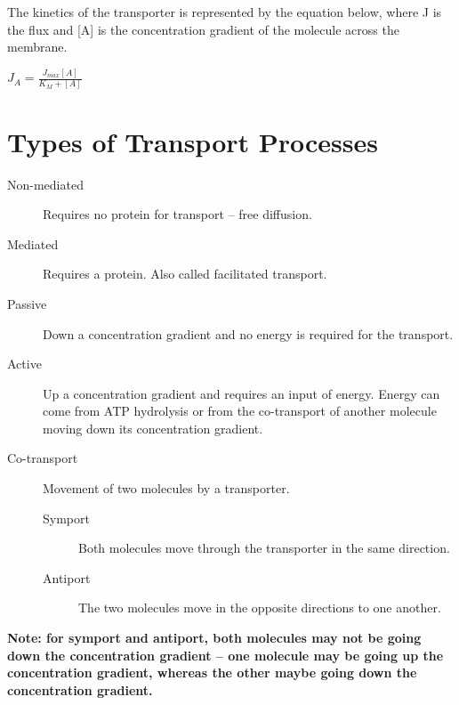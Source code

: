 The kinetics of the transporter is represented by the equation below, where J is the flux and [A] is the concentration gradient of the molecule across the membrane.

\begin{center}
\large{$J_A = \frac{J_{max}[A]}{K_M + [A]}$}
\end{center}

\section{Types of Transport Processes}

\begin{description}
\item [Non-mediated] Requires no protein for transport -- free diffusion.
\item [Mediated] Requires a protein. Also called facilitated transport.
\item [Passive] Down a concentration gradient and no energy is required for the transport.
\item [Active] Up a concentration gradient and requires an input of energy. Energy can come from ATP hydrolysis or from the co-transport of another molecule moving down its concentration gradient.
\item [Co-transport] Movement of two molecules by a transporter.
\begin{description}
\item [Symport] Both molecules move through the transporter in the same direction.
\item [Antiport] The two molecules move in the opposite directions to one another.
\end{description}
\end{description}

\vspace{0.5cm}

\textbf{Note: for symport and antiport, both molecules may not be going down the concentration gradient -- one molecule may be going up the concentration gradient, whereas the other maybe going down the concentration gradient.}

